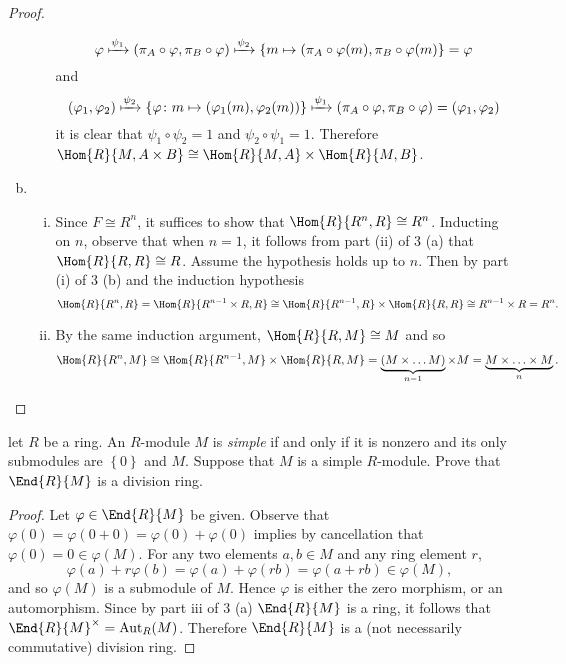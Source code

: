 \documentclass[10pt]{amsart}
\begin{document}
\begin{thm}
\begin{proof}
\begin{enumerate}[(a)]
\begin{enumerate}[(ii)]
  $$\varphi \xmapsto{\psi_1} (\pi_A \circ \varphi, \pi_B \circ \varphi) \xmapsto{\psi_2} \{m \mapsto (\pi_A \circ \varphi(m), \pi_B \circ \varphi(m)\} = \varphi$$
  and
  $$(\varphi_1, \varphi_2) \xmapsto{\psi_2} \{\varphi \colon m \mapsto (\varphi_1(m), \varphi_2(m))\} \xmapsto{\psi_1} (\pi_A \circ \varphi, \pi_B \circ \varphi) = (\varphi_1, \varphi_2)$$
  it is clear that $\psi_1 \circ \psi_2 = 1$ and $\psi_2 \circ \psi_1 = 1$.
  Therefore $\Hom{R}{M, A \times B} \cong \Hom{R}{M, A} \times \Hom{R}{M,B}$.
\end{enumerate}
\item
  \begin{enumerate}[(i)]
  \item
    Since $F \cong R^n$, it suffices to show that $\Hom{R}{R^n, R} \cong R^n$.
    Inducting on $n$, observe that when $n = 1$, it follows from part (ii) of 3 (a) that $\Hom{R}{R, R} \cong R$.
    Assume the hypothesis holds up to $n$.
    Then by part (i) of 3 (b) and the induction hypothesis
    $$\Hom{R}{R^n, R} = \Hom{R}{R^{n-1} \times R, R} \cong \Hom{R}{R^{n-1}, R} \times \Hom{R}{R, R} \cong R^{n-1} \times R = R^n.$$
  \item
    By the same induction argument, $\Hom{R}{R,M} \cong M$ and so 
    $$\Hom{R}{R^n,M} \cong \Hom{R}{R^{n-1}, M} \times \Hom{R}{R,M} = \underbrace{(M \times \ldots M)}_{n-1} \times M = \underbrace{M \times \ldots \times M}_n.$$
  \end{enumerate}
\end{enumerate}
\end{proof}

\end{thm}

\begin{thm}
  let $R$ be a ring.
  An $R$-module $M$ is {\it simple} if and only if it is nonzero and its only submodules are $\left\{0\right\}$ and $M$.
  Suppose that $M$ is a simple $R$-module.
  Prove that $\End{R}{M}$ is a division ring.

\begin{proof}
  Let $\varphi \in \End{R}{M}$ be given.
Observe that $\varphi(0) = \varphi(0 + 0) = \varphi(0) + \varphi(0)$ implies by cancellation that $\varphi(0) = 0 \in \varphi(M)$.
For any two elements $a, b \in M$ and any ring element $r$,
$$\varphi(a) + r\varphi(b) = \varphi(a) + \varphi(rb) = \varphi(a + rb) \in \varphi(M),$$
and so $\varphi(M)$ is a submodule of $M$.
Hence $\varphi$ is either the zero morphism, or an automorphism.
Since by part iii of 3 (a) $\End{R}{M}$ is a ring, it follows that $\End{R}{M}^\times = \operatorname{Aut}_R(M)$.
		Therefore $\End{R}{M}$ is a (not necessarily commutative) division ring.
	\end{proof}
\end{thm}  
\end{document}
